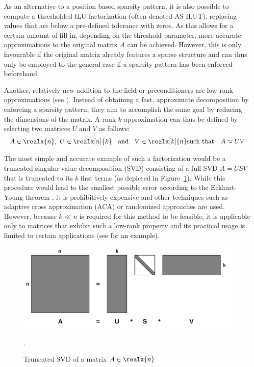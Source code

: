 As an alternative to a position based sparsity pattern, it is also possible to compute a thresholded ILU factorization (often denoted AS ILUT), replacing values that are below a pre-defined tolerance with zeros. As this allows for a certain amount of fill-in, depending on the threshold parameter, more accurate approximations to the original matrix $A$ can be achieved. However, this is only favourable if the original matrix already features a sparse structure and can thus only be employed to the general case if a sparsity pattern has been enforced beforehand.

Another, relatively new addition to the field or preconditioners are low-rank approximations (see \cite{markovsky_low_2011}). Instead of obtaining a fast, approximate decomposition by enforcing a sparsity pattern, they aim to accomplish the same goal by reducing the dimensions of the matrix. A rank $k$ approximation can thus be defined by selecting two matrices $U$ and $V$ as follows:
\begin{equation}
    A \in \realx{n}\text{,}\:\; U \in \realx[n]{k}\;\; \text{ and }\;\; V \in \realx[k]{n}
    \text{such that }\;\ A \approx UV
\end{equation}

\noindent The most simple and accurate example of such a factorization would be a truncated singular value decomposition (SVD) consisting of a full SVD $A=USV$ that is truncated to its $k$ first terms (as depicted in Figure~\hyperref[fig:svd]{\ref{fig:svd}}). While this procedure would lead to the smallest possible error according to the Eckhart-Young theorem \cite{eckart_approximation_1936}, it is prohibitively expensive and other techniques such as adaptive cross approximation (ACA) \cite{rjasanow_adaptive_2000} or randomized approaches \cite{martinsson_randomized_2019} are used. However, because $k \ll n$ is required for this method to be feasible, it is applicable only to matrices that exhibit such a low-rank property and its practical usage is limited to certain applications (see \cite{higham_new_2019} for an example).

\begin{figure}[h]
    \centering
    \includegraphics[width=0.7\linewidth]{chapters/2_solvers/2_3_iterative_solvers/figures/SVD.pdf}
    \caption{Truncated SVD of a matrix $A \in \realx{n}$}.
    \label{fig:svd}
\end{figure}

